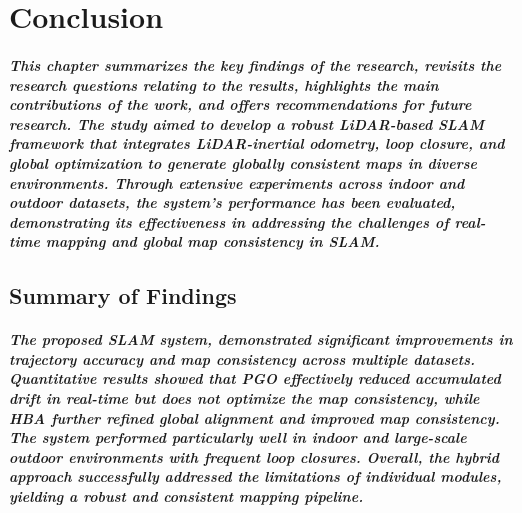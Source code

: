 \chapter{Conclusion}
\label{ch:conclusion}

% 
\paragraph{\textnormal{
This chapter summarizes the key findings of the research, revisits the research questions relating to the results, highlights the main contributions of the work, and offers recommendations for future research. The study aimed to develop a robust LiDAR-based SLAM framework that integrates LiDAR-inertial odometry, loop closure, and global optimization to generate globally consistent maps in diverse environments. Through extensive experiments across indoor and outdoor datasets, the system's performance has been evaluated, demonstrating its effectiveness in addressing the challenges of real-time mapping and global map consistency in SLAM.
}}

\section{Summary of Findings}
\paragraph{\textnormal{
The proposed SLAM system, demonstrated significant improvements in trajectory accuracy and map consistency across multiple datasets. Quantitative results showed that PGO effectively reduced accumulated drift in real-time but does not optimize the map consistency, while HBA further refined global alignment and improved map consistency. The system performed particularly well in indoor and large-scale outdoor environments with frequent loop closures. Overall, the hybrid approach successfully addressed the limitations of individual modules, yielding a robust and consistent mapping pipeline.
}}

